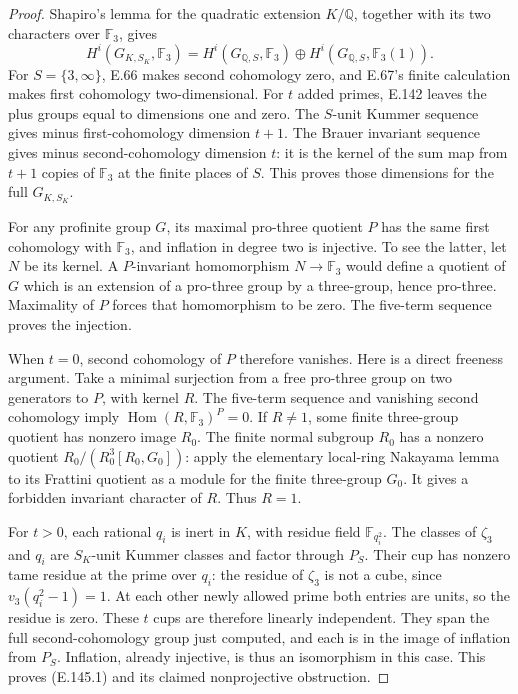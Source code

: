 \begin{proof}
Shapiro's lemma for the quadratic extension
\(K/\mathbb Q\), together with its two
characters over \(\mathbb F_3\), gives
\[
 H^i(G_{K,S_K},\mathbb F_3)
   =H^i(G_{\mathbb Q,S},\mathbb F_3)
      \oplus H^i(G_{\mathbb Q,S},\mathbb F_3(1)).
 \tag{E.145.2}
\]
For \(S=\{3,\infty\}\), E.66 makes second
cohomology zero, and E.67's finite calculation
makes first cohomology two-dimensional.
For \(t\) added primes, E.142 leaves the
plus groups equal to dimensions one and zero.
The \(S\)-unit Kummer sequence gives minus
first-cohomology dimension \(t+1\).
The Brauer invariant sequence gives minus
second-cohomology dimension \(t\): it is
the kernel of the sum map from \(t+1\)
copies of \(\mathbb F_3\) at the finite
places of \(S\). This proves those
dimensions for the full \(G_{K,S_K}\).

For any profinite group \(G\), its maximal
pro-three quotient \(P\) has the same
first cohomology with \(\mathbb F_3\),
and inflation in degree two is injective.
To see the latter, let \(N\) be its kernel.
A \(P\)-invariant homomorphism
\(N\to\mathbb F_3\) would define a quotient
of \(G\) which is an extension of a
pro-three group by a three-group, hence
pro-three. Maximality of \(P\) forces that
homomorphism to be zero.
The five-term sequence proves the injection.

When \(t=0\), second cohomology of \(P\)
therefore vanishes. Here is a direct
freeness argument. Take a minimal
surjection from a free pro-three group
on two generators to \(P\), with kernel
\(R\). The five-term sequence and
vanishing second cohomology imply
\(\operatorname{Hom}(R,\mathbb F_3)^P=0\).
If \(R\ne1\), some finite three-group
quotient has nonzero image \(R_0\).
The finite normal subgroup \(R_0\)
has a nonzero quotient
 \(R_0/(R_0^3[R_0,G_0])\):
apply the elementary local-ring Nakayama
lemma to its Frattini quotient as a
module for the finite three-group \(G_0\).
It gives a forbidden invariant character
of \(R\). Thus \(R=1\).

For \(t>0\), each rational \(q_i\) is
inert in \(K\), with residue field
\(\mathbb F_{q_i^2}\).
The classes of \(\zeta_3\) and \(q_i\)
are \(S_K\)-unit Kummer classes and
factor through \(P_S\).
Their cup has nonzero tame residue at
the prime over \(q_i\):
the residue of \(\zeta_3\) is not a
cube, since \(v_3(q_i^2-1)=1\).
At each other newly allowed prime both
entries are units, so the residue is
zero. These \(t\) cups are therefore
linearly independent.
They span the full second-cohomology
group just computed, and each is in
the image of inflation from \(P_S\).
Inflation, already injective, is thus
an isomorphism in this case.
This proves (E.145.1) and its claimed
nonprojective obstruction.
\end{proof}
